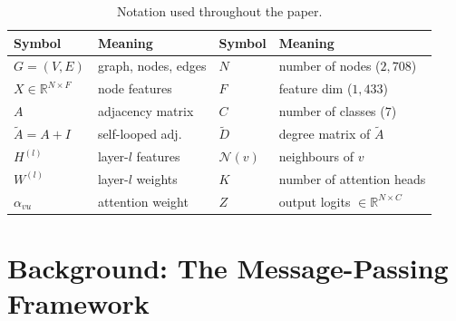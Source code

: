 \documentclass{article}
\begin{document}
\begin{table}[h]
  \centering
  \caption{Notation used throughout the paper.}
  \label{tab:notation}
  \begin{tabular}{ll@{\hskip 3em}ll}
    \toprule
    Symbol & Meaning & Symbol & Meaning \\
    \midrule
    $G=(V,E)$ & graph, nodes, edges      & $N$ & number of nodes ($2{,}708$) \\
    $X \in \mathbb{R}^{N\times F}$ & node features & $F$ & feature dim ($1{,}433$) \\
    $A$ & adjacency matrix              & $C$ & number of classes ($7$) \\
    $\tilde{A}=A+I$ & self-looped adj.   & $\tilde{D}$ & degree matrix of $\tilde{A}$ \\
    $H^{(l)}$ & layer-$l$ features       & $\mathcal{N}(v)$ & neighbours of $v$ \\
    $W^{(l)}$ & layer-$l$ weights        & $K$ & number of attention heads \\
    $\alpha_{vu}$ & attention weight     & $Z$ & output logits $\in\mathbb{R}^{N\times C}$ \\
    \bottomrule
  \end{tabular}
\end{table}

\section{Background: The Message-Passing Framework}
\label{sec:background}
\end{document}
